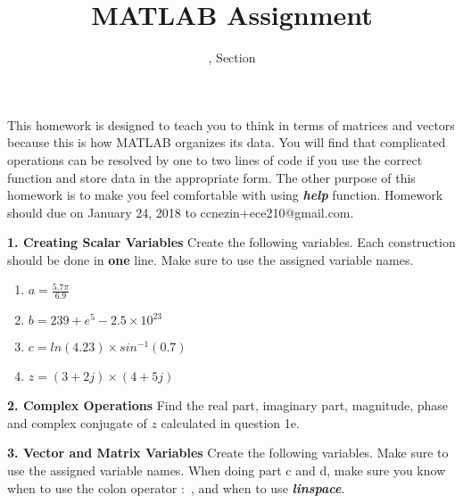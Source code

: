 \documentclass[11pt]{article}
\title{MATLAB Assignment \Homework}
\author{\Session, Section \Section}
\date{}
\makeatletter
\def\MyEmail{ccnezin+ece210@gmail.com}
\def\DateOfSubmission{January 24, 2018 }
\newenvironment{qparts}{\begin{enumerate}[{(}a{)}]}{\end{enumerate}}
\makeatother
\begin{document}
\maketitle

This homework is designed to teach you to think in terms of matrices and vectors because this is how MATLAB organizes its data. You will find that complicated operations can be resolved by one to two lines of code if you use the correct function and store data in the appropriate form. The other purpose of this homework is to make you feel comfortable with using \textbf{\textit{help}} function. Homework should due on \DateOfSubmission  to \MyEmail. 

\noindent \textbf{1. Creating Scalar Variables} Create the following variables. Each construction should be done in \textbf{one} line. Make sure to use the assigned variable names. 
\begin{qparts}
\item
$ a = \frac{5.7 \pi}{6.9} $
\item 
$ b = 239+e^5 - 2.5 \times 10^{23}$
\item
$ c = ln(4.23) \times sin^{-1}(0.7)$
\item 
$ z = (3+2j) \times (4+5j) $

\end{qparts}

\noindent \textbf{2. Complex Operations} Find the real part, imaginary part, magnitude, phase and complex conjugate of $z$ calculated in question 1e.

\noindent \textbf{3. Vector and Matrix Variables} Create the following variables. Make sure to use the assigned variable names. When doing part c and d, make sure you know when to use the colon operator $:$ , and when to use \textbf{\textit{linspace}}. 
\end{document}

